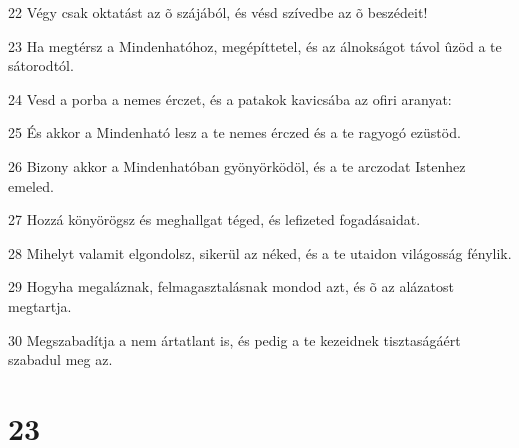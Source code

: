 \par 22 Végy csak oktatást az õ szájából, és vésd szívedbe az õ beszédeit!
\par 23 Ha megtérsz a Mindenhatóhoz, megépíttetel, és az álnokságot távol ûzöd a te sátorodtól.
\par 24 Vesd a porba a nemes érczet, és a patakok kavicsába az ofiri aranyat:
\par 25 És akkor a Mindenható lesz a te nemes érczed és a te ragyogó ezüstöd.
\par 26 Bizony akkor a Mindenhatóban gyönyörködöl, és a te arczodat Istenhez emeled.
\par 27 Hozzá könyörögsz és meghallgat téged, és lefizeted fogadásaidat.
\par 28 Mihelyt valamit elgondolsz, sikerül az néked, és a te utaidon világosság fénylik.
\par 29 Hogyha megaláznak, felmagasztalásnak mondod azt, és õ az alázatost megtartja.
\par 30 Megszabadítja a nem ártatlant is, és pedig a te kezeidnek tisztaságáért szabadul meg az.

\chapter{23}

